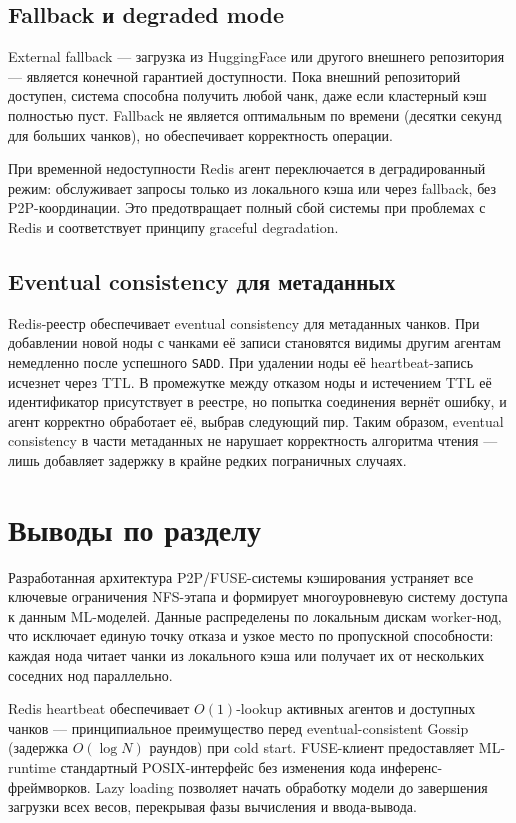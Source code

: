\subsection*{Fallback и degraded mode}

External fallback --- загрузка из HuggingFace или другого внешнего репозитория --- является конечной гарантией доступности. Пока внешний репозиторий доступен, система способна получить любой чанк, даже если кластерный кэш полностью пуст. Fallback не является оптимальным по времени (десятки секунд для больших чанков), но обеспечивает корректность операции.

При временной недоступности Redis агент переключается в деградированный режим: обслуживает запросы только из локального кэша или через fallback, без P2P-координации. Это предотвращает полный сбой системы при проблемах с Redis и соответствует принципу graceful degradation.

\subsection*{Eventual consistency для метаданных}

Redis-реестр обеспечивает eventual consistency для метаданных чанков. При добавлении новой ноды с чанками её записи становятся видимы другим агентам немедленно после успешного \texttt{SADD}. При удалении ноды её heartbeat-запись исчезнет через TTL. В промежутке между отказом ноды и истечением TTL её идентификатор присутствует в реестре, но попытка соединения вернёт ошибку, и агент корректно обработает её, выбрав следующий пир. Таким образом, eventual consistency в части метаданных не нарушает корректность алгоритма чтения --- лишь добавляет задержку в крайне редких пограничных случаях.

\section{Выводы по разделу}

Разработанная архитектура P2P/FUSE-системы кэширования устраняет все ключевые ограничения NFS-этапа и формирует многоуровневую систему доступа к данным ML-моделей. Данные распределены по локальным дискам worker-нод, что исключает единую точку отказа и узкое место по пропускной способности: каждая нода читает чанки из локального кэша или получает их от нескольких соседних нод параллельно.

Redis heartbeat обеспечивает $O(1)$-lookup активных агентов и доступных чанков --- принципиальное преимущество перед eventual-consistent Gossip (задержка $O(\log N)$ раундов) при cold start. FUSE-клиент предоставляет ML-runtime стандартный POSIX-интерфейс без изменения кода инференс-фреймворков. Lazy loading позволяет начать обработку модели до завершения загрузки всех весов, перекрывая фазы вычисления и ввода-вывода.

